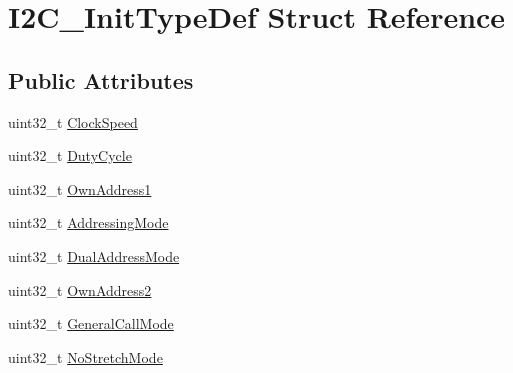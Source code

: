 \hypertarget{struct_i2_c___init_type_def}{\section{I2\-C\-\_\-\-Init\-Type\-Def Struct Reference}
\label{struct_i2_c___init_type_def}
}
\subsection*{Public Attributes}
\begin{DoxyCompactItemize}
\item 
uint32\-\_\-t \hyperlink{struct_i2_c___init_type_def_a45f1209e7e43e55f055bd9ead064230a}{Clock\-Speed}
\item 
uint32\-\_\-t \hyperlink{struct_i2_c___init_type_def_a91eb2f998ac771478ec0f44ac73c32dd}{Duty\-Cycle}
\item 
uint32\-\_\-t \hyperlink{struct_i2_c___init_type_def_abfb610317ea08e85c8feece82ccc9e16}{Own\-Address1}
\item 
uint32\-\_\-t \hyperlink{struct_i2_c___init_type_def_a5c39c41a5ee892c1bce69a579cc017ca}{Addressing\-Mode}
\item 
uint32\-\_\-t \hyperlink{struct_i2_c___init_type_def_add6a6b87ee067d33c94c554288736d40}{Dual\-Address\-Mode}
\item 
uint32\-\_\-t \hyperlink{struct_i2_c___init_type_def_a8165caf61b7b52f903edd7517ddaa06b}{Own\-Address2}
\item 
uint32\-\_\-t \hyperlink{struct_i2_c___init_type_def_a17ce92b135a4b5c045a5387c91677803}{General\-Call\-Mode}
\item 
uint32\-\_\-t \hyperlink{struct_i2_c___init_type_def_a28afdce458703464638f1a01e04da04e}{No\-Stretch\-Mode}
\end{DoxyCompactItemize}


